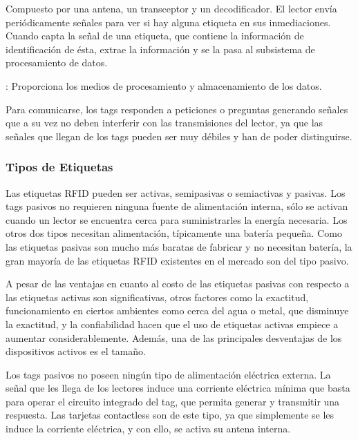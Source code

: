 
Compuesto por una antena, un transceptor y un decodificador. El lector envía periódicamente señales para ver si hay alguna etiqueta en sus inmediaciones. Cuando capta la señal de una etiqueta, que contiene la información de identificación de ésta, extrae la información y se la pasa al subsistema de procesamiento de datos.

: 
Proporciona los medios de procesamiento y almacenamiento de los datos. 


Para comunicarse, los tags responden a peticiones o preguntas generando señales que a su vez no deben interferir con las transmisiones del lector, ya que las señales que llegan de los tags pueden ser muy débiles y han de poder distinguirse.

\subsubsection{Tipos de Etiquetas}

Las etiquetas RFID pueden ser activas, semipasivas o semiactivas y pasivas. Los tags pasivos no requieren ninguna fuente de alimentación interna, sólo se activan cuando un lector se encuentra cerca para suministrarles la energía necesaria. Los otros dos tipos necesitan alimentación, típicamente una batería pequeña. Como las etiquetas pasivas son mucho más baratas de fabricar y no necesitan batería, la gran mayoría de las etiquetas RFID existentes en el mercado son del tipo pasivo.


A pesar de las ventajas en cuanto al costo de las etiquetas pasivas con respecto a las etiquetas activas son significativas, otros factores como la exactitud, funcionamiento en ciertos ambientes como cerca del agua o metal, que disminuye la exactitud, y la confiabilidad hacen que el uso de etiquetas activas empiece a aumentar considerablemente. Además, una de las principales desventajas de los dispositivos activos es el tamaño.



Los tags pasivos no poseen ningún tipo de alimentación eléctrica externa. La señal que les llega de los lectores induce una corriente eléctrica mínima que basta para operar el circuito integrado del tag, que permita generar y transmitir una respuesta. Las tarjetas contactless son de este tipo, ya que simplemente se les induce la corriente eléctrica, y con ello, se activa su antena interna.


